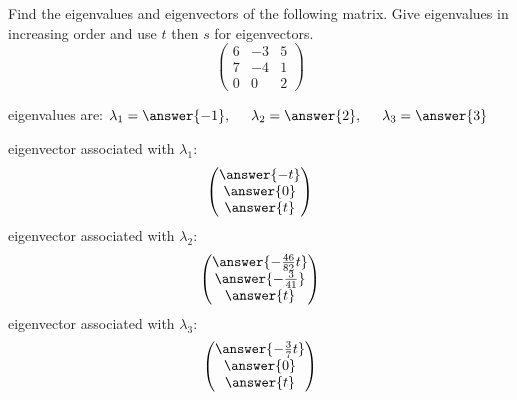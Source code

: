 \documentclass{ximera}
\begin{document}
\begin{exercise}

Find the eigenvalues and eigenvectors of the following matrix. Give eigenvalues in increasing order and use $t$ then $s$ for eigenvectors.
\[
\begin{pmatrix}
6 & -3 & 5\\
7 & -4 & 1\\
0 & 0 & 2
\end{pmatrix}
\]
\begin{prompt}
eigenvalues are: $\lambda_{1} = \answer{-1}, \hspace{.5cm} \lambda_{2}= \answer{2}, \hspace{.5cm} \lambda_{3} = \answer{3}$

eigenvector associated with $\lambda_{1}$:
\[
\begin{pmatrix}
\answer{-t}\\
\answer{0}\\
\answer{t}
\end{pmatrix}
\]
eigenvector associated with $\lambda_{2}$:
\[
\begin{pmatrix}
\answer{-\frac{46}{82}t}\\
\answer{-\frac{3}{41}}\\
\answer{t}
\end{pmatrix}
\]
eigenvector associated with $\lambda_{3}$:
\[
\begin{pmatrix}
\answer{-\frac{3}{7}t}\\
\answer{0}\\
\answer{t}
\end{pmatrix}
\]
\end{prompt}

\end{exercise}
\end{document}

